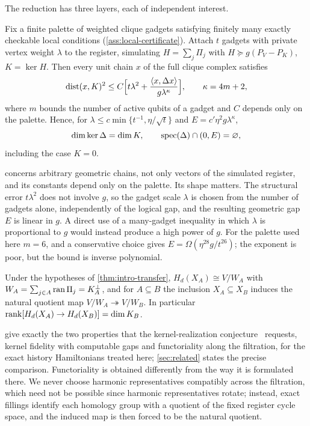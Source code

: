 The reduction has three layers, each of independent interest.

\begin{theorem}
\label{thm:intro-transfer}
Fix a finite palette of weighted clique gadgets satisfying finitely many exactly checkable local conditions (\cref{ass:local-certificate}). Attach \(t\) gadgets with private vertex weight \(\lambda\) to the register, simulating \(H=\sum_j\Pi_j\) with \(H\succeq g(P_V-P_{K})\), \(K=\ker H\). Then every unit chain \(x\) of the full clique complex satisfies
\begin{equation}
\label{eq:intro-concentration}
\operatorname{dist}(x,K)^2\le C\Bigl[t\lambda^2+\frac{\langle x,\Delta x\rangle}{g\lambda^{\kappa}}\Bigr],\qquad\kappa=4m+2,
\end{equation}
where \(m\) bounds the number of active qubits of a gadget and \(C\) depends only on the palette. Hence, for \(\lambda\le c\min\{t^{-1},\eta/\sqrt t\}\) and \(E=c'\eta^2g\lambda^\kappa\),
\[
\dim\ker\Delta=\dim K,\qquad\operatorname{spec}(\Delta)\cap(0,E)=\varnothing,
\]
including the case \(K=0\).
\end{theorem}

 concerns arbitrary geometric chains, not only vectors of the simulated register, and its constants depend only on the palette. Its shape matters. The structural error \(t\lambda^2\) does not involve \(g\), so the gadget scale \(\lambda\) is chosen from the number of gadgets alone, independently of the logical gap, and the resulting geometric gap \(E\) is linear in \(g\). A direct use of a many-gadget inequality in which \(\lambda\) is proportional to \(g\) would instead produce a high power of \(g\). For the palette used here \(m=6\), and a conservative choice gives \(E=\Omega(\eta^{28}g/t^{26})\); the exponent is poor, but the bound is inverse polynomial.

\begin{theorem}
\label{thm:intro-quotient}
Under the hypotheses of \cref{thm:intro-transfer}, \(H_d(X_A)\cong V/W_A\) with \(W_A=\sum_{j\in A}\operatorname{ran}\Pi_j=K_A^\perp\), and for \(A\subseteq B\) the inclusion \(X_A\subseteq X_B\) induces the natural quotient map \(V/W_A\twoheadrightarrow V/W_B\). In particular \(\operatorname{rank}[H_d(X_A)\to H_d(X_B)]=\dim K_B\).
\end{theorem}

 give exactly the two properties that the kernel-realization conjecture~\cite[Conjecture~2]{lowe2026normalized} requests, kernel fidelity with computable gaps and functoriality along the filtration, for the exact history Hamiltonians treated here; \cref{sec:related} states the precise comparison. Functoriality is obtained differently from the way it is formulated there. We never choose harmonic representatives compatibly across the filtration, which need not be possible since harmonic representatives rotate; instead, exact fillings identify each homology group with a quotient of the fixed register cycle space, and the induced map is then forced to be the natural quotient.

